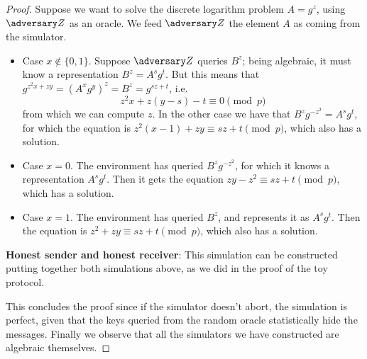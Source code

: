 \begin{proof}
    Suppose we want to solve the discrete logarithm problem $A=g^z$, using $\zdv$ as an oracle. We feed $\zdv$ the element $A$ as coming from the simulator.
    \begin{itemize}
        \item Case $x\not\in\{0,1\}$. Suppose $\zdv$ queries $B^z$; being algebraic, it must know a representation $B^z=A^sg^t$. But this means that $g^{z^2x+zy}=(A^xg^y)^z=B^z=g^{sz+t}$, i.e. $$z^2x+z(y-s)-t\equiv 0\pmod p$$ from which we can compute $z$. In the other case we have that $B^zg^{-z^2}=A^sg^t$, for which the equation is $z^2(x-1)+zy\equiv sz+t\pmod p$, which also has a solution.
        \item Case $x=0$. The environment has queried $B^zg^{-z^2}$, for which it knows a representation $A^sg^t$. Then it gets the equation $zy-z^2\equiv sz+t\pmod p$, which has a solution.
        \item Case $x=1$. The environment has queried $B^z$, and represents it as $A^sg^t$. Then the equation is $z^2+zy\equiv sz+t\pmod p$, which also has a solution.
    \end{itemize}

    \textbf{Honest sender and honest receiver}: This simulation can be constructed putting together both simulations above, as we did in the proof of the toy protocol.

    This concludes the proof since if the simulator doesn't abort, the simulation is perfect, given that the keys queried from the random oracle statistically hide the messages. Finally we observe that all the simulators we have constructed are algebraic themselves.
\end{proof}
